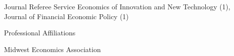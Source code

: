\documentclass{resume} %
\begin{document}
\begin{rSection}{Journal Referee Service}
	Economics of Innovation and New Technology (1), Journal of Financial Economic Policy (1)
\end{rSection}

\begin{rSection}{Professional Affiliations}


	Midwest Economics Association
\end{rSection}




 	
 


\end{document}
